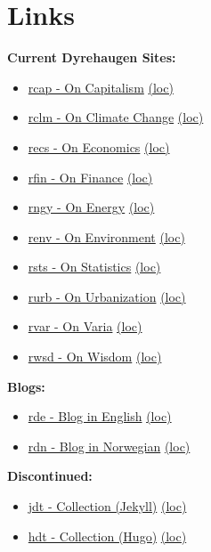 \documentclass[
]{book}
\providecommand{\tightlist}{%
  \setlength{\itemsep}{0pt}\setlength{\parskip}{0pt}}
\begin{document}
\hypertarget{links}{%
\chapter{Links}\label{links}}

\textbf{Current Dyrehaugen Sites:}

\begin{itemize}
\tightlist
\item
  \href{https://dyrehaugen.github.io/rcap}{rcap - On Capitalism} \href{http://localhost/rcap}{(loc)}
\item
  \href{https://dyrehaugen.github.io/rclm}{rclm - On Climate Change} \href{http://localhost/rclm}{(loc)}
\item
  \href{https://dyrehaugen.github.io/recs}{recs - On Economics} \href{http://localhost/recs}{(loc)}
\item
  \href{https://dyrehaugen.github.io/rngy}{rfin - On Finance} \href{http://localhost/rfin}{(loc)}
\item
  \href{https://dyrehaugen.github.io/rngy}{rngy - On Energy} \href{http://localhost/rngy}{(loc)}
\item
  \href{https://dyrehaugen.github.io/renv}{renv - On Environment} \href{http://localhost/renv}{(loc)}
\item
  \href{https://dyrehaugen.github.io/rsts}{rsts - On Statistics} \href{http://localhost/rsts}{(loc)}
\item
  \href{https://dyrehaugen.github.io/rurb}{rurb - On Urbanization} \href{http://localhost/rurb}{(loc)}
\item
  \href{https://dyrehaugen.github.io/rvar}{rvar - On Varia} \href{http://localhost/rvar}{(loc)}
\item
  \href{https://dyrehaugen.github.io/rwsd}{rwsd - On Wisdom} \href{http://localhost/rwsd}{(loc)}
\end{itemize}

\textbf{Blogs:}

\begin{itemize}
\tightlist
\item
  \href{https://dyrehaugen.github.io/rde}{rde - Blog in English} \href{http://localhost/rde}{(loc)}
\item
  \href{https://dyrehaugen.github.io/rdn}{rdn - Blog in Norwegian} \href{http://localhost/rdn}{(loc)}
\end{itemize}

\textbf{Discontinued:}

\begin{itemize}
\tightlist
\item
  \href{https://dyrehaugen.github.io/jdt}{jdt - Collection (Jekyll)} \href{http://localhost/jdt}{(loc)}
\item
  \href{https://dyrehaugen.github.io/hdt}{hdt - Collection (Hugo)} \href{http://localhost/hdt}{(loc)}
\end{itemize}
\end{document}
